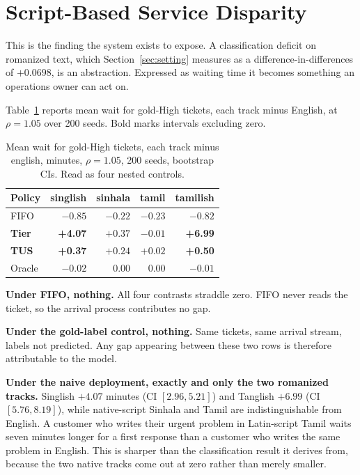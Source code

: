 \section{Script-Based Service Disparity}
\label{sec:disparity}

This is the finding the system exists to expose. A classification deficit on
romanized text, which Section~\ref{sec:setting} measures as a
difference-in-differences of $+0.0698$, is an abstraction. Expressed as waiting
time it becomes something an operations owner can act on.

Table~\ref{tab:disparity} reports mean wait for gold-High tickets, each
track minus English, at $\rho = 1.05$ over 200 seeds. Bold marks intervals
excluding zero.

\begin{table}[!tb]
\caption{Mean wait for gold-High tickets, each track minus english, minutes,
$\rho=1.05$, 200 seeds, bootstrap CIs. Read as four nested controls.}
\label{tab:disparity}
\centering
\small
\begin{tabular}{@{}lrrrr@{}}
\toprule
Policy & singlish & sinhala & tamil & tamilish \\
\midrule
FIFO           & $-0.85$ & $-0.22$ & $-0.23$ & $-0.82$ \\
\textbf{Tier}  & \textbf{+4.07} & $+0.37$ & $-0.01$ & \textbf{+6.99} \\
\textbf{TUS}   & \textbf{+0.37} & $+0.24$ & $+0.02$ & \textbf{+0.50} \\
Oracle         & $-0.02$ & $0.00$ & $0.00$ & $-0.01$ \\
\bottomrule
\end{tabular}
\end{table}

\textbf{Under FIFO, nothing.} All four contrasts straddle zero. FIFO never reads
the ticket, so the arrival process contributes no gap.

\textbf{Under the gold-label control, nothing.} Same tickets, same arrival
stream, labels not predicted. Any gap appearing between these two rows is
therefore attributable to the model.

\textbf{Under the naive deployment, exactly and only the two romanized tracks.}
Singlish $+4.07$ minutes (CI $[2.96, 5.21]$) and Tanglish $+6.99$ (CI
$[5.76, 8.19]$), while native-script Sinhala and Tamil are indistinguishable from
English. A customer who writes their urgent problem in Latin-script Tamil waits
seven minutes longer for a first response than a customer who writes the same
problem in English. This is sharper than the classification result it derives
from, because the two native tracks come out at zero rather than merely smaller.

